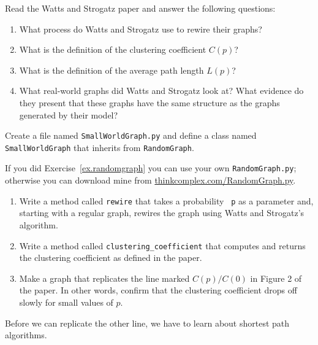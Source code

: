 \documentclass[10pt]{book}
\begin{document}
\begin{ex}

Read the Watts and Strogatz paper and answer the following
questions:

\begin{enumerate}

\item What process do Watts and Strogatz use to rewire their
graphs?

\item What is the definition of the clustering coefficient $C(p)$?

\item What is the definition of the average path length $L(p)$?

\item What real-world graphs did Watts and Strogatz look at?
What evidence do they present that these graphs have the
same structure as the graphs generated by their model?

\end{enumerate}

\end{ex}  


\begin{ex}

Create a file named {\tt SmallWorldGraph.py} and define a class named 
{\tt SmallWorldGraph} that inherits from {\tt RandomGraph}.

If you did Exercise~\ref{ex.randomgraph} you can use your own 
{\tt RandomGraph.py}; otherwise you can download mine from
\url{thinkcomplex.com/RandomGraph.py}.

\begin{enumerate}

\item Write a method called {\tt rewire} that takes a probability {\tt
  p} as a parameter and, starting with a regular graph, rewires
the graph using Watts and Strogatz's algorithm.

\item Write a method called \verb"clustering_coefficient" that
computes and returns the clustering coefficient as defined in the
paper.

\item Make a graph that replicates the line marked $C(p)/C(0)$ in
Figure 2 of the paper.  In other words, 
confirm that the clustering coefficient drops off slowly for
small values of $p$.

\end{enumerate}

Before we can replicate the other line, we have to learn about shortest
path algorithms.

\end{ex}
\end{document}
